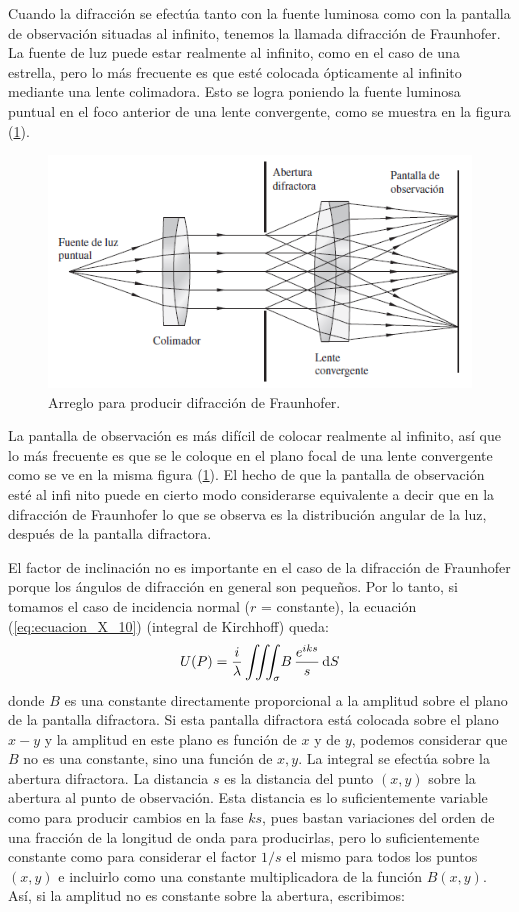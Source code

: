 \documentclass[14pt]{extarticle}
\def\scaleiiint#1{\vcenter{\hbox{\scaleto[6ex]{\displaystyle\iiint}{#1}}}}
\def\bs{\mkern-12mu}
\begin{document}
Cuando la difracción se efectúa tanto con la fuente luminosa como con la pantalla de observación situadas al infinito, tenemos la llamada difracción de Fraunhofer. La fuente de luz puede estar realmente al infinito, como en el caso de una estrella, pero lo más frecuente es que esté colocada ópticamente al infinito mediante una lente colimadora. Esto se logra poniendo la fuente luminosa puntual en el foco anterior de una lente convergente, como se muestra en la figura (\ref{fig:figura_X_15}).
\begin{figure}[H]
    \centering
    \includegraphics[scale=0.8]{Imagenes/Difraccion_15.png}
    \caption{Arreglo para producir difracción de Fraunhofer.}
    \label{fig:figura_X_15}
\end{figure}
La pantalla de observación es más difícil de colocar realmente al infinito, así que lo más frecuente es que se le coloque en el plano focal de una lente convergente como se ve en la misma figura (\ref{fig:figura_X_15}). El hecho de que la pantalla de observación esté al infi nito puede en cierto modo considerarse equivalente a decir que en la difracción de Fraunhofer lo que se observa es la distribución angular de la luz, después de la pantalla difractora.
\par
El factor de inclinación no es importante en el caso de la difracción de Fraunhofer porque los ángulos de difracción en general son pequeños. Por lo tanto, si tomamos el caso de incidencia normal ($r$ = constante), la ecuación (\ref{eq:ecuacion_X_10}) (integral de Kirchhoff) queda:
\begin{align}
U (P) = \dfrac{i}{\lambda} \, \scaleiiint{6ex}_{\bs \sigma} B \, \dfrac{e^{i k s}}{s} \dd{S}
\label{eq:ecuacion_X_35}
\end{align}
donde $B$ es una constante directamente proporcional a la amplitud sobre el plano de la pantalla difractora. Si esta pantalla difractora está colocada sobre el plano $x-y$ y la amplitud en este plano es función de $x$ y de $y$, podemos considerar que $B$ no es una constante, sino una función de $x, y$. La integral se efectúa sobre la abertura difractora. La distancia $s$ es la distancia del punto $(x, y)$ sobre la abertura al punto de observación. Esta distancia es lo suficientemente variable como para producir cambios en la fase $k s$, pues bastan variaciones del orden de una fracción de la longitud de onda para producirlas, pero lo suficientemente constante como para considerar el factor $1/s$ el mismo para todos los puntos $(x, y)$ e incluirlo como una constante multiplicadora de la función $B (x, y)$. Así, si la amplitud no es constante sobre la abertura, escribimos:
\end{document}
